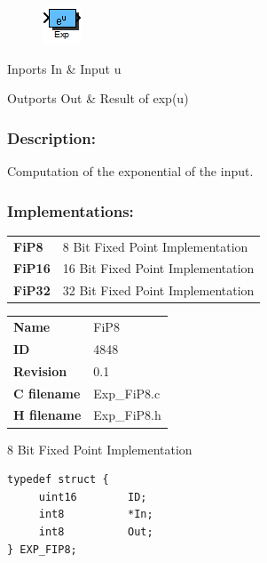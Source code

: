 \label{block:Exp}
\begin{figure}[H]\includegraphics{Exp}\end{figure} 

\begin{XtoCtabular}{Inports}
In & Input u\tabularnewline
\hline
\end{XtoCtabular}


\begin{XtoCtabular}{Outports}
Out & Result of exp(u)\tabularnewline
\hline
\end{XtoCtabular}

\subsubsection*{Description:}
Computation of the exponential of the input.


\subsubsection*{Implementations:}
\begin{tabular}{l l}
\textbf{FiP8} & 8 Bit Fixed Point Implementation\tabularnewline
\textbf{FiP16} & 16 Bit Fixed Point Implementation\tabularnewline
\textbf{FiP32} & 32 Bit Fixed Point Implementation\tabularnewline
\end{tabular}

\nopagebreak[0]
\begin{tabular}{l l}
\textbf{Name} & FiP8 \tabularnewline
\textbf{ID} & 4848 \tabularnewline
\textbf{Revision} & 0.1 \tabularnewline
\textbf{C filename} & Exp\_FiP8.c \tabularnewline
\textbf{H filename} & Exp\_FiP8.h \tabularnewline
\end{tabular}
\vspace{1ex}

8 Bit Fixed Point Implementation

\begin{lstlisting}
typedef struct {
     uint16        ID;
     int8          *In;
     int8          Out;
} EXP_FIP8;
\end{lstlisting}

